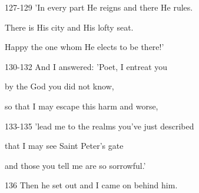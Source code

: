 \documentclass[oneside]{ctexbook}
\begin{document}
\begin{mytext}{127-129}
'In every part He reigns and there He rules.

There is His city and His lofty seat.

Happy the one whom He elects to be there!'
\end{mytext}

\begin{mytext}{130-132}
And I answered: 'Poet, I entreat you

by the God you did not know,

so that I may escape this harm and worse,
\end{mytext}

\begin{mytext}{133-135}
'lead me to the realms you've just described

that I may see Saint Peter's gate

and those you tell me are so sorrowful.'
\end{mytext}

\begin{mytext}{136}
Then he set out and I came on behind him.
\end{mytext}

\chapter{}
\end{document}

